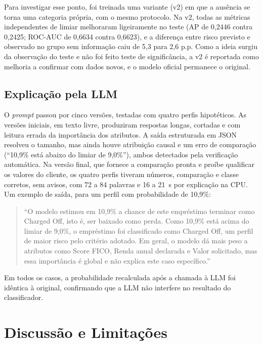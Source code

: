 \documentclass[12pt]{article}
\begin{document}
Para investigar esse ponto, foi treinada uma variante (v2) em que a ausência se
torna uma categoria própria, com o mesmo protocolo. Na v2, todas as métricas
independentes de limiar melhoraram ligeiramente no teste (AP de 0,2446 contra
0,2425; ROC-AUC de 0,6634 contra 0,6623), e a diferença entre risco previsto e
observado no grupo sem informação caiu de 5,3 para 2,6 p.p. Como a ideia surgiu
da observação do teste e não foi feito teste de significância, a v2 é reportada
como melhoria a confirmar com dados novos, e o modelo oficial permanece o
original.

\subsection{Explicação pela LLM}

O \textit{prompt} passou por cinco versões, testadas com quatro perfis
hipotéticos. As versões iniciais, em texto livre, produziram respostas longas,
cortadas e com leitura errada da importância dos atributos. A saída estruturada
em JSON resolveu o tamanho, mas ainda houve atribuição causal e um erro de
comparação (``10,9\% está abaixo do limiar de 9,0\%''), ambos detectados pela
verificação automática. Na versão final, que fornece a comparação pronta e
proíbe qualificar os valores do cliente, os quatro perfis tiveram números,
comparação e classe corretos, sem avisos, com 72 a 84 palavras e 16 a 21~s por
explicação na CPU. Um exemplo de saída, para um perfil com probabilidade de
10,9\%:

\begin{quote}
\small ``O modelo estimou em 10,9\% a chance de este empréstimo terminar como
Charged Off, isto é, ser baixado como perda. Como 10,9\% está acima do limiar de
9,0\%, o empréstimo foi classificado como Charged Off, um perfil de maior risco
pelo critério adotado. Em geral, o modelo dá mais peso a atributos como Score
FICO, Renda anual declarada e Valor solicitado, mas essa importância é global e
não explica este caso específico.''
\end{quote}

Em todos os casos, a probabilidade recalculada após a chamada à LLM foi idêntica
à original, confirmando que a LLM não interfere no resultado do classificador.


\section{Discussão e Limitações}\label{sec:discussao}
\end{document}
